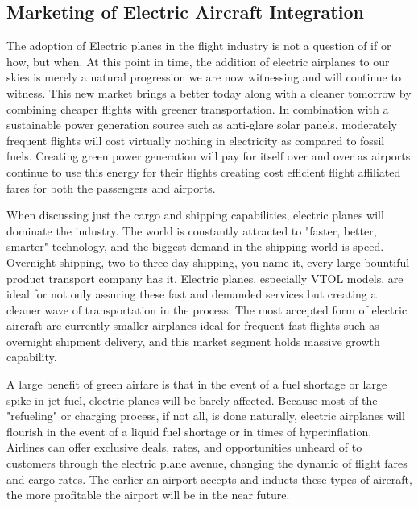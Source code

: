 \documentclass[../main.tex]{subfiles}
\begin{document}
\subsection{Marketing of Electric Aircraft Integration} %
The adoption of Electric planes in the flight industry is not a question of if or how, but when. At this point in time, the addition of electric airplanes to our skies is merely a natural progression we are now witnessing and will continue to witness. This new market brings a better today along with a cleaner tomorrow by combining cheaper flights with greener transportation. In combination with a sustainable power generation source such as anti-glare solar panels, moderately frequent flights will cost virtually nothing in electricity as compared to fossil fuels. Creating green power generation will pay for itself over and over as airports continue to use this energy for their flights creating cost efficient flight affiliated fares for both the passengers and airports.\par
When discussing just the cargo and shipping capabilities, electric planes will dominate the industry. The world is constantly attracted to "faster, better, smarter" technology, and the biggest demand in the shipping world is speed. Overnight shipping, two-to-three-day shipping, you name it, every large bountiful product transport company has it. Electric planes, especially VTOL models, are ideal for not only assuring these fast and demanded services but creating a cleaner wave of transportation in the process. The most accepted form of electric aircraft are currently smaller airplanes ideal for frequent fast flights such as overnight shipment delivery, and this market segment holds massive growth capability.\par
A large benefit of green airfare is that in the event of a fuel shortage or large spike in jet fuel, electric planes will be barely affected. Because most of the "refueling" or charging process, if not all, is done naturally, electric airplanes will flourish in the event of a liquid fuel shortage or in times of hyperinflation. Airlines can offer exclusive deals, rates, and opportunities unheard of to customers through the electric plane avenue, changing the dynamic of flight fares and cargo rates.  The earlier an airport accepts and inducts these types of aircraft, the more profitable the airport will be in the near future.\par 
\end{document}
